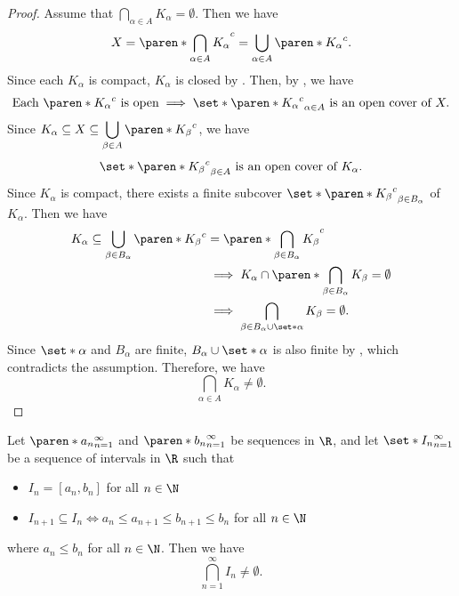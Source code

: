 \begin{proof}
    Assume that $\displaystyle \bigcap_{\alpha \in A} K_{\alpha} = \emptyset$. Then we have
    \[
    X = \paren*{\bigcap_{\alpha \in A} K_{\alpha}}^{c} = \bigcup_{\alpha \in A} \paren*{K_{\alpha}}^{c}.
    \]
    Since each $K_{\alpha}$ is compact, $K_{\alpha}$ is closed by .
    Then, by , we have
    \[
    \text{Each } \paren*{K_{\alpha}}^{c} \text{ is open} \implies
    \set*{\paren*{K_{\alpha}}^{c}}_{\alpha \in A} \text{ is an open cover of } X.
    \]
    Since $K_{\alpha} \subseteq X \subseteq \displaystyle \bigcup_{\beta \in A} \paren*{K_{\beta}}^{c}$, we have
    \[
    \set*{\paren*{K_{\beta}}^{c}}_{\beta \in A} \text{ is an open cover of } K_{\alpha}.
    \]
    Since $K_{\alpha}$ is compact, there exists a finite subcover
    $\set*{\paren*{K_{\beta}}^{c}}_{\beta \in B_{\alpha}}$ of $K_{\alpha}$. Then we have
    \begin{align*}
        K_{\alpha} \subseteq \bigcup_{\beta \in B_{\alpha}} \paren*{K_{\beta}}^{c}
        &= \paren*{\bigcap_{\beta \in B_{\alpha}} K_{\beta}}^{c} \\
        &\implies K_{\alpha} \cap \paren*{\bigcap_{\beta \in B_{\alpha}} K_{\beta}} = \emptyset \\
        &\implies \bigcap_{\beta \in B_{\alpha} \cup \set*{\alpha}} K_{\beta} = \emptyset.
    \end{align*}
    Since $\set*{\alpha}$ and $B_{\alpha}$ are finite, $B_{\alpha} \cup \set*{\alpha}$ is also finite
    by , which contradicts the assumption. Therefore, we have
    \[
    \bigcap_{\alpha \in A} K_{\alpha} \neq \emptyset.
    \]
\end{proof}

\bigskip

\begin{lemma} \label{lem:NestedIntervals}
    Let $\paren*{a_{n}}_{n = 1}^{\infty}$ and $\paren*{b_{n}}_{n = 1}^{\infty}$ be sequences in $\R$,
    and let $\set*{I_{n}}_{n = 1}^{\infty}$ be a sequence of intervals in $\R$ such that
    \begin{itemize}
        \item $I_{n} = [a_{n}, b_{n}]$ for all $n \in \N$
        \item $I_{n + 1} \subseteq I_{n} \iff a_{n} \leq a_{n + 1} \leq b_{n + 1} \leq b_{n}$ for all $n \in \N$
    \end{itemize}
    where $a_{n} \leq b_{n}$ for all $n \in \N$. Then we have
    \[
    \bigcap_{n = 1}^{\infty} I_{n} \neq \emptyset.
    \]
\end{lemma}

